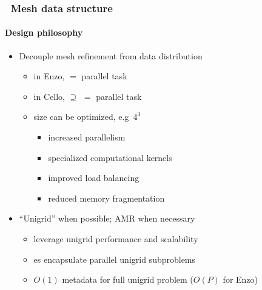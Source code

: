 \begin{frame}[fragile] 
\frametitle{\cello\ Mesh data structure}
\framesubtitle{Design philosophy}
\begin{itemize}
\small
\item Decouple mesh refinement from data distribution
  \begin{itemize}
  \item in Enzo,    $=$ parallel task 
  \item in Cello,   $\supseteq$  $=$ parallel task
  \item {} size can be optimized, e.g~$4^3$
       \begin{itemize}
       \item increased parallelism
       \item specialized computational kernels
       \item improved load balancing
       \item reduced memory fragmentation
       \end{itemize}
  \end{itemize}
\item ``Unigrid'' when possible; AMR when necessary
  \begin{itemize}
  \item leverage unigrid performance and scalability
  \item {}es encapsulate parallel unigrid subproblems
  \item $O(1)$ metadata for full unigrid problem ($O(P)$ for Enzo)
  \end{itemize}
\end{itemize}

\end{frame}

